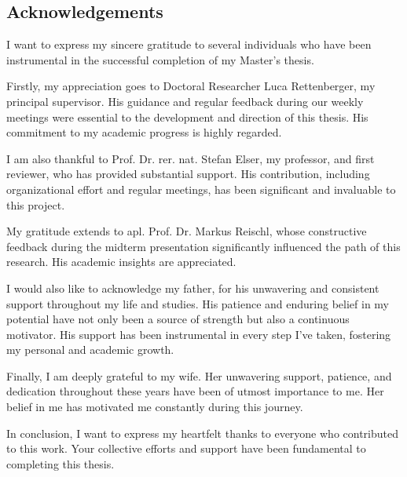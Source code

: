 \begin{newpage}
    \vspace*{\fill}
    \section*{Acknowledgements}
    I want to express my sincere gratitude to several individuals who have been instrumental in the successful completion of my Master's thesis.

    Firstly, my appreciation goes to Doctoral Researcher Luca Rettenberger, my principal supervisor. His guidance and regular feedback during our weekly meetings were essential to the development and direction of this thesis. His commitment to my academic progress is highly regarded.

    I am also thankful to Prof. Dr. rer. nat. Stefan Elser, my professor, and first reviewer, who has provided substantial support. His contribution, including organizational effort and regular meetings, has been significant and invaluable to this project.

    My gratitude extends to apl. Prof. Dr. Markus Reischl, whose constructive feedback during the midterm presentation significantly influenced the path of this research. His academic insights are appreciated.

    I would also like to acknowledge my father, for his unwavering and consistent support throughout my life and studies. His patience and enduring belief in my potential have not only been a source of strength but also a continuous motivator. His support has been instrumental in every step I've taken, fostering my personal and academic growth.

    Finally, I am deeply grateful to my wife. Her unwavering support, patience, and dedication throughout these years have been of utmost importance to me. Her belief in me has motivated me constantly during this journey.

    In conclusion, I want to express my heartfelt thanks to everyone who contributed to this work. Your collective efforts and support have been fundamental to completing this thesis.
\end{newpage}